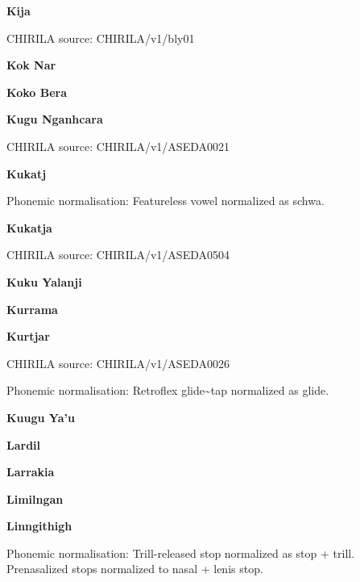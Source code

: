 
\textbf{Kija}

CHIRILA source: CHIRILA/v1/bly01


\textbf{Kok Nar}


\textbf{Koko Bera}


\textbf{Kugu Nganhcara}

CHIRILA source: CHIRILA/v1/ASEDA0021


\textbf{Kukatj}


Phonemic normalisation: Featureless vowel normalized as schwa.

\textbf{Kukatja}

CHIRILA source: CHIRILA/v1/ASEDA0504


\textbf{Kuku Yalanji}


\newpage


\textbf{Kurrama}


\textbf{Kurtjar}

CHIRILA source: CHIRILA/v1/ASEDA0026


Phonemic normalisation: Retroflex glide\textasciitilde{}tap normalized
as glide.

\textbf{Kuugu Ya'u}


\textbf{Lardil}


\textbf{Larrakia}


\textbf{Limilngan}


\textbf{Linngithigh}


Phonemic normalisation: Trill-released stop normalized as stop + trill.
Prenasalized stops normalized to nasal + lenis stop.

